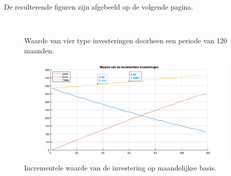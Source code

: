

De resulterende figuren zijn afgebeeld op de volgende pagina.

\thispagestyle{empty}

\vspace*{\fill}

\begin{figure}[h]
\centering
{}\\
\caption{Waarde van vier type investeringen doorheen een periode van 120 maanden.}%
\label{fig:op8}
\end{figure}

\begin{figure}[h]
\centering
\includegraphics[width=0.95\textwidth]{res/op9b.png}
\caption{Incrementele waarde van de investering op maandelijkse basis.}
\label{fig:op9a}
\end{figure}

